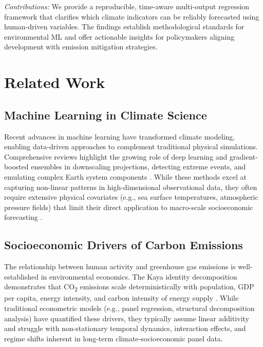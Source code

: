 \documentclass[conference]{IEEEtran}
\begin{document}
\textit{Contributions:} We provide a reproducible, time-aware multi-output
regression framework that clarifies which climate indicators can be reliably
forecasted using human-driven variables. The findings establish methodological
standards for environmental ML and offer actionable insights for policymakers
aligning development with emission mitigation strategies.

\section{Related Work}

\subsection{Machine Learning in Climate Science}

Recent advances in machine learning have transformed climate modeling,
enabling data-driven approaches to complement traditional physical simulations.
Comprehensive reviews highlight the growing role of deep learning and
gradient-boosted ensembles in downscaling projections, detecting extreme
events, and emulating complex Earth system components \cite{rolnick2022tackling}.
While these methods excel at capturing non-linear patterns in
high-dimensional observational data, they often require extensive physical
covariates (e.g., sea surface temperatures, atmospheric pressure fields) that
limit their direct application to macro-scale socioeconomic
forecasting \cite{ipcc2023synthesis}.

\subsection{Socioeconomic Drivers of Carbon Emissions}

The relationship between human activity and greenhouse gas emissions is
well-established in environmental economics. The Kaya identity decomposition
demonstrates that CO\textsubscript{2} emissions scale deterministically with
population, GDP per capita, energy intensity, and carbon intensity of energy
supply \cite{friedlingstein2022global}. While traditional econometric models
(e.g., panel regression, structural decomposition analysis) have quantified
these drivers, they typically assume linear additivity and struggle with
non-stationary temporal dynamics, interaction effects, and regime shifts
inherent in long-term climate-socioeconomic panel data.
\end{document}
